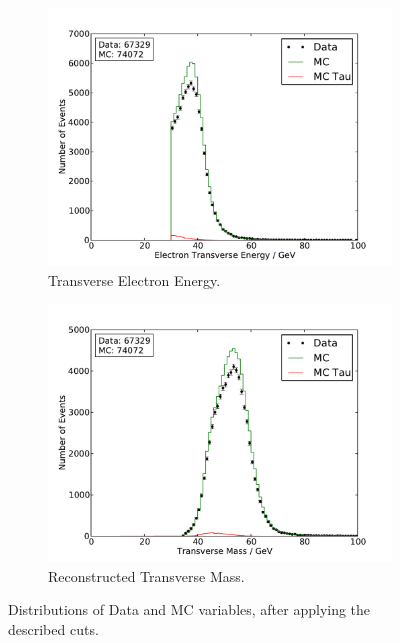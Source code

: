 \documentclass[
	paper=A4,
	parskip=full,
	chapterprefix=true,
	11pt,
	headings=normal,
	bibliography=totoc,
	listof=totoc,
	titlepage=on,
]{scrreprt}
\begin{document}
\begin{figure}%
	\centering
	\begin{subfigure}{0.45\textwidth}
		\includegraphics{./allcuts/E_T_el}
		\caption{Transverse Electron Energy.}
	\end{subfigure}
	\begin{subfigure}{0.45\textwidth}
		\includegraphics{./allcuts/m_T}
		\caption{Reconstructed Transverse Mass.}
	\end{subfigure}
	\caption{Distributions of Data and MC variables, after applying the described cuts.}
	\label{fig:cuts_EtMt}
\end{figure}




\cleardoublepage


{}
\end{document}
